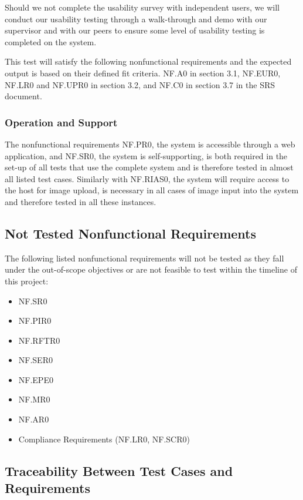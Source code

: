 \documentclass[12pt, titlepage]{article}
\begin{document}
Should we not complete the usability survey with independent users, we will conduct our usability testing through a walk-through and demo with our supervisor and with our peers to ensure some level of usability testing is completed on the system.  

This test will satisfy the following nonfunctional requirements and the expected output is based on their defined fit criteria. NF.A0 in section 3.1, NF.EUR0, NF.LR0 and NF.UPR0 in section 3.2, and NF.C0 in section 3.7 in the SRS document.

\subsubsection{Operation and Support}
\noindent The nonfunctional requirements NF.PR0, the system is accessible through a web application, and NF.SR0, the system is self-supporting, is both required in the set-up of all tests that use the complete system and is therefore tested in almost all listed test cases. Similarly with NF.RIAS0, the system will require access to the host for image upload, is necessary in all cases of image input into the system and therefore tested in all these instances. 

\subsection{Not Tested Nonfunctional Requirements}
The following listed nonfunctional requirements will not be tested as they fall under the out-of-scope objectives or are not feasible to test within the timeline of this project:
\begin{itemize}
    \item NF.SR0
    \item NF.PIR0
    \item NF.RFTR0
    \item NF.SER0
    \item NF.EPE0
    \item NF.MR0
    \item NF.AR0
    \item Compliance Requirements (NF.LR0, NF.SCR0)
\end{itemize}

\newpage

\subsection{Traceability Between Test Cases and Requirements}
\end{document}
